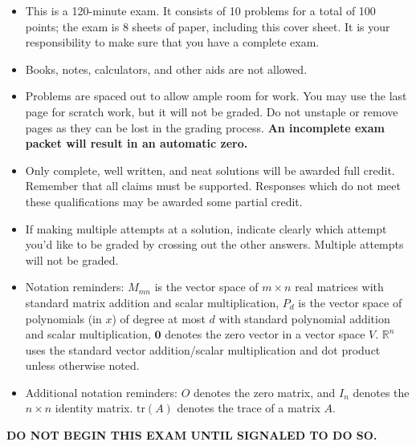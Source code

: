 \documentclass[12pt]{extarticle}
\begin{document}
\begin{itemize}
    \item This is a 120-minute exam. It consists of 10 problems for a total of 100 points; the exam is 8 sheets of paper, including this cover sheet. It is your responsibility to make sure that you have a complete exam.\vspace{-.1in}


    \item Books, notes, calculators, and other aids are not allowed.\vspace{-.1in}

    \item Problems are spaced out to allow ample room for work. You may use the last page for scratch work, but it will not be graded. Do not unstaple or remove pages as they can be lost in the grading process.  \textbf{An incomplete exam packet will result in an automatic zero.}  \vspace{-.1in}

    \item Only complete, well written, and neat solutions will be awarded full credit. Remember that all claims must be supported. Responses which do not meet these qualifications may be awarded some partial credit.\vspace{-.1in}
 \item  If making multiple attempts at a solution, indicate clearly which attempt you'd like to be graded by crossing out the other answers. Multiple attempts will not be graded.
 \vspace{-0.2cm} 
        \item Notation reminders: $M_{mn}$ is the vector space of $m\times n$ real matrices with standard matrix addition and scalar multiplication, $P_d$ is the vector space of polynomials (in $x$) of degree at most $d$ with standard polynomial addition and scalar multiplication, $\mathbf{0}$ denotes the zero vector in a vector space $V$. $\mathbb{R}^n$ uses the standard vector addition/scalar multiplication and dot product unless otherwise noted.
 \item Additional notation reminders: $O$ denotes the zero matrix, and $I_n$ denotes the $n\times n$ identity matrix. $\text{tr}(A)$ denotes the trace of a matrix $A$.
 
\end{itemize}


\textbf{DO NOT BEGIN THIS EXAM UNTIL SIGNALED TO DO SO.}


\bigskip
\end{document}
